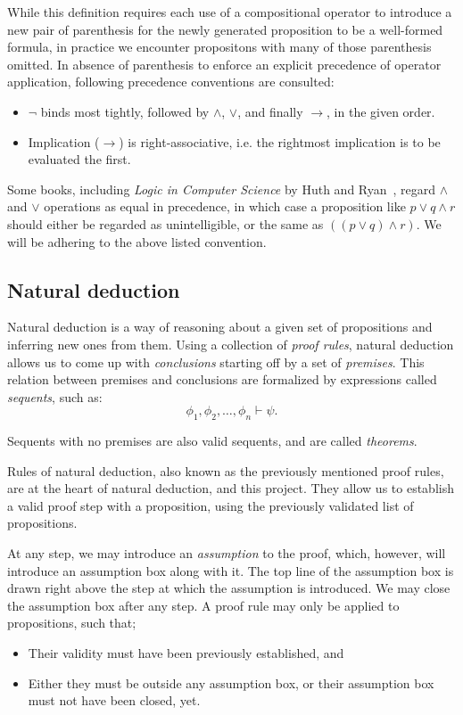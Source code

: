 \documentclass{article}
\newcommand{\imp}{\ensuremath{\rightarrow}}
\begin{document}
While this definition requires each use of a compositional operator
to introduce a new pair of parenthesis for the newly generated
proposition to be a well-formed formula, in practice we encounter
propositons with many of those parenthesis omitted. In absence of
parenthesis to enforce an explicit precedence of operator application,
following precedence conventions are consulted:

\begin{itemize}
	\item $\neg$ binds most tightly, followed by $\land$, $\lor$, and
		finally $\imp$, in the given order.
	\item Implication ($\imp$) is right-associative, i.e. the
		rightmost implication is to be evaluated the first.
\end{itemize}

Some books, including \textit{Logic in Computer Science} by Huth and
Ryan~\cite{huth2004logic},
regard $\land$ and $\lor$ operations as equal in precedence, in which
case a proposition like $p \lor q \land r$ should either be regarded
as unintelligible, or the same as $((p \lor q) \land r)$.
We will be adhering to the above listed convention.

\subsection{Natural deduction}\label{sec:intr_nd}

Natural deduction is a way of reasoning about a given set of propositions
and inferring new ones from them. Using a collection of \textit{proof rules},
natural deduction allows us to come up with \textit{conclusions} starting
off by a set of \textit{premises}. This relation between premises and
conclusions are formalized by expressions called \textit{sequents},
such as:
$$
\phi_1, \phi_2, \dotsc, \phi_n \vdash \psi.
$$

Sequents with no premises are also valid sequents, and are called
\textit{theorems}.

Rules of natural deduction, also known as the previously mentioned
proof rules, are at the heart of natural deduction, and this project.
They allow us to establish a valid proof step with a proposition,
using the previously validated list of propositions.

At any step, we may introduce an \textit{assumption} to the proof,
which, however, will introduce an assumption box along with it.
The top line of the assumption box is drawn right above the step
at which the assumption is introduced. We may close the assumption
box after any step. A proof rule may only be applied to propositions,
such that;
\begin{itemize}
	\item Their validity must have been previously established, and
	\item Either they must be outside any assumption box, or their
		assumption box must not have been closed, yet.
\end{itemize}
\end{document}
